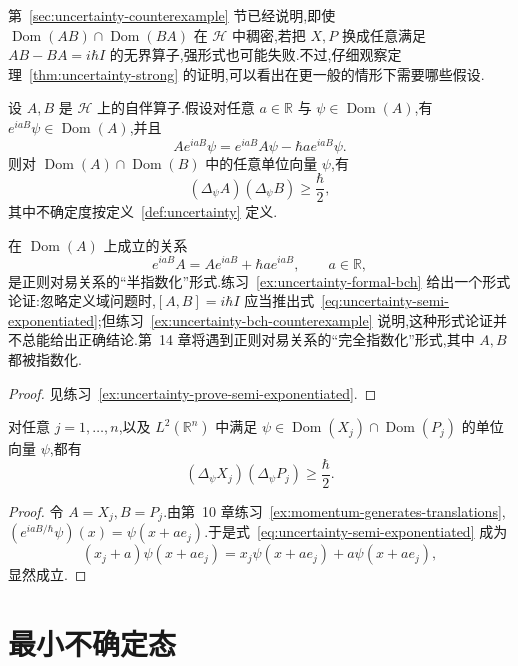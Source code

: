 第~\ref{sec:uncertainty-counterexample} 节已经说明,即使 $\operatorname{Dom}(AB)\cap\operatorname{Dom}(BA)$ 在 $\mathcal H$ 中稠密,若把 $X,P$ 换成任意满足 $AB-BA=i\hbar I$ 的无界算子,强形式也可能失败.不过,仔细观察定理~\ref{thm:uncertainty-strong} 的证明,可以看出在更一般的情形下需要哪些假设.

\begin{theorem}[半指数化对易关系下的不确定性原理]\label{thm:uncertainty-semi-exponentiated}
设 $A,B$ 是 $\mathcal H$ 上的自伴算子.假设对任意 $a\in\mathbb R$ 与 $\psi\in\operatorname{Dom}(A)$,有 $e^{iaB}\psi\in\operatorname{Dom}(A)$,并且
\[
Ae^{iaB}\psi=e^{iaB}A\psi-\hbar a e^{iaB}\psi.
\label{eq:uncertainty-semi-exponentiated}
\]
则对 $\operatorname{Dom}(A)\cap\operatorname{Dom}(B)$ 中的任意单位向量 $\psi$,有
\[
(\Delta_\psi A)(\Delta_\psi B)\geq\frac{\hbar}{2},
\]
其中不确定度按定义~\ref{def:uncertainty} 定义.
\end{theorem}

在 $\operatorname{Dom}(A)$ 上成立的关系
\[
e^{iaB}A=Ae^{iaB}+\hbar a e^{iaB},\qquad a\in\mathbb R,
\label{eq:uncertainty-semi-exponentiated-rearranged}
\]
是正则对易关系的“半指数化”形式.练习~\ref{ex:uncertainty-formal-bch} 给出一个形式论证:忽略定义域问题时,$[A,B]=i\hbar I$ 应当推出式~\eqref{eq:uncertainty-semi-exponentiated};但练习~\ref{ex:uncertainty-bch-counterexample} 说明,这种形式论证并不总能给出正确结论.第~14 章将遇到正则对易关系的“完全指数化”形式,其中 $A,B$ 都被指数化.

\begin{proof}
见练习~\ref{ex:uncertainty-prove-semi-exponentiated}.
\end{proof}

\begin{corollary}[多维位置与动量的不确定性原理]\label{cor:uncertainty-multidimensional}
对任意 $j=1,\ldots,n$,以及 $L^2(\mathbb R^n)$ 中满足 $\psi\in\operatorname{Dom}(X_j)\cap\operatorname{Dom}(P_j)$ 的单位向量 $\psi$,都有
\[
(\Delta_\psi X_j)(\Delta_\psi P_j)\geq\frac{\hbar}{2}.
\]
\end{corollary}

\begin{proof}
令 $A=X_j,B=P_j$.由第~10 章练习~\ref{ex:momentum-generates-translations},$(e^{iaB/\hbar}\psi)(x)=\psi(x+a e_j)$.于是式~\eqref{eq:uncertainty-semi-exponentiated} 成为
\[
(x_j+a)\psi(x+a e_j)=x_j\psi(x+a e_j)+a\psi(x+a e_j),
\]
显然成立.
\end{proof}

\section{最小不确定态}
\label{sec:minimum-uncertainty}

